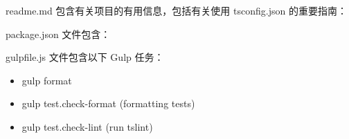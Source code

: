 readme.md 包含有关项目的有用信息，包括有关使用 tsconfig.json 的重要指南：


package.json 文件包含：




gulpfile.js 文件包含以下 Gulp 任务：

\begin{itemize}
  \item gulp format
  \item gulp test.check-format (formatting tests)
  \item gulp test.check-lint (run tslint)
\end{itemize}
